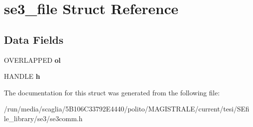 \hypertarget{structse3__file}{\section{se3\-\_\-file Struct Reference}
\label{structse3__file}
}
\subsection*{Data Fields}
\begin{DoxyCompactItemize}
\item 
\hypertarget{structse3__file_a9c5b0958cf31e525f4245b6aff394713}{O\-V\-E\-R\-L\-A\-P\-P\-E\-D {\bfseries ol}}\label{structse3__file_a9c5b0958cf31e525f4245b6aff394713}

\item 
\hypertarget{structse3__file_ab8b97e53c056cd8549914f6de3296d6f}{H\-A\-N\-D\-L\-E {\bfseries h}}\label{structse3__file_ab8b97e53c056cd8549914f6de3296d6f}

\end{DoxyCompactItemize}


The documentation for this struct was generated from the following file\-:\begin{DoxyCompactItemize}
\item 
/run/media/scaglia/5\-B106\-C33792\-E4440/polito/\-M\-A\-G\-I\-S\-T\-R\-A\-L\-E/current/tesi/\-S\-Efile\-\_\-library/se3/se3comm.\-h\end{DoxyCompactItemize}
